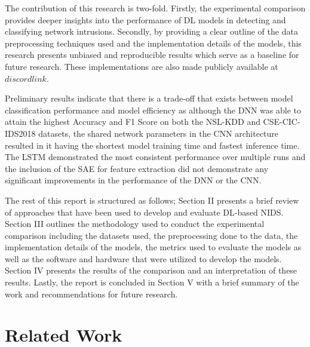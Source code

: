\documentclass[conference]{IEEEtran}
\begin{document}
The contribution of this research is two-fold. Firstly, the experimental comparison provides deeper insights into the performance of DL models in detecting and classifying network intrusions. Secondly, by providing a clear outline of the data preprocessing techniques used and the implementation details of the models, this research presents unbiased and reproducible results which serve as a baseline for future research. These implementations are also made publicly available at $discord link$. 

Preliminary results indicate that there is a trade-off that exists between model classification performance and model efficiency as although the DNN was able to attain the highest Accuracy and F1 Score on both the NSL-KDD and CSE-CIC-IDS2018 datasets, the shared network parameters in the CNN architecture resulted in it having the shortest model training time and fastest inference time. The LSTM demonstrated the most consistent performance over multiple runs and the inclusion of the SAE for feature extraction did not demonstrate any significant improvements in the performance of the DNN or the CNN.

The rest of this report is structured as follows; Section II presents a brief review of approaches that have been used to develop and evaluate DL-based NIDS. Section III outlines the methodology used to conduct the experimental comparison including the datasets used, the preprocessing done to the data, the implementation details of the models, the metrics used to evaluate the models as well as the software and hardware that were utilized to develop the models. Section IV presents the results of the comparison and an interpretation of these results. Lastly, the report is concluded in Section V with a brief summary of the work and recommendations for future research. 

\section{Related Work}
\end{document}
